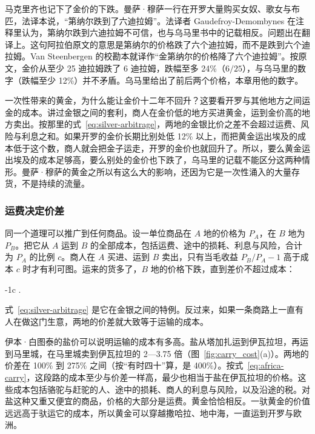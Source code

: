 马克里齐也记下了金价的下跌。曼萨·穆萨一行在开罗大量购买女奴、歌女与布匹，法译本说，“第纳尔跌到了六迪拉姆”\cite{umari1927}。法译者 Gaudefroy-Demombynes 在注释里认为，第纳尔跌到六迪拉姆不可信，也与乌马里书中的记载相反\cite{umari1927}。问题出在翻译上。这句阿拉伯原文的意思是第纳尔的价格跌了六个迪拉姆，而不是跌到六个迪拉姆。Van Steenbergen 的校勘本就译作“金第纳尔的价格降了六个迪拉姆”\cite{vs2016}。按原文，金价从至少 25 迪拉姆跌了 6 迪拉姆，跌幅至多 24\%（$6/25$），与乌马里的数字（跌幅至少 12\%）并不矛盾。乌马里给出了前后两个价格，本章用他的数字。

一次性带来的黄金，为什么能让金价十二年不回升？这要看开罗与其他地方之间运金的成本。讲过金银之间的套利，商人在金价低的地方买进黄金，运到金价高的地方卖出。按那里的式~\eqref{eq:silver-arbitrage}，两地的金银比价之差不会超过运费、风险与利息之和。如果开罗的金价长期比别处低 12\% 以上，而把黄金运出埃及的成本低于这个数，商人就会把金子运走，开罗的金价也就回升了。所以，要么黄金运出埃及的成本足够高，要么别处的金价也下跌了，乌马里的记载不能区分这两种情形。曼萨·穆萨的黄金之所以有这么大的影响，还因为它是一次性涌入的大量存货，不是持续的流量。

\subsubsection{运费决定价差}
同一个道理可以推广到任何商品。设一单位商品在 $A$ 地的价格为 $P_A$，在 $B$ 地为 $P_B$。把它从 $A$ 运到 $B$ 的全部成本，包括运费、途中的损耗、利息与风险，合计为 $P_A$ 的比例 $c$。商人在 $A$ 买进、运到 $B$ 卖出，只有当毛收益 $P_B/P_A-1$ 高于成本 $c$ 时才有利可图。运来的货多了，$B$ 地的价格下跌，直到差价不超过成本：
\begin{keyeq}
-1\;\le\;c .\label{eq:africa-carry}
\end{keyeq}
式~\eqref{eq:silver-arbitrage} 是它在金银之间的特例。反过来，如果一条商路上一直有人在做这门生意，两地的价差就大致等于运输的成本。

伊本·白图泰的盐价可以说明运输的成本有多高。盐从塔加扎运到伊瓦拉坦，再运到马里城，在马里城卖到伊瓦拉坦的 2—3.75 倍（图~\ref{fig:carry_cost}(a)）。两地的价差在 100\% 到 275\% 之间（按“有时四十”算，是 400\%）。按式~\eqref{eq:africa-carry}，这段路的成本至少与价差一样高，最少也相当于盐在伊瓦拉坦的价格。这些成本包括骆驼与赶驼的人、途中的损耗、商人的利息与风险，以及沿途的税。对盐这种又重又便宜的商品，价格的大部分是运费。黄金恰恰相反。一驮黄金的价值远远高于驮运它的成本，所以黄金可以穿越撒哈拉、地中海，一直运到开罗与欧洲。


